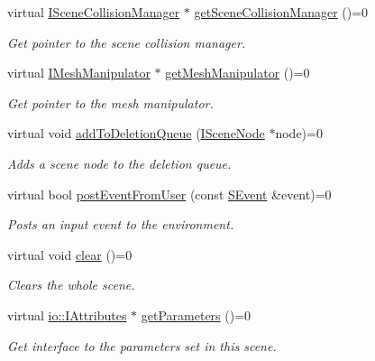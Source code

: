 \begin{DoxyCompactItemize}
virtual \hyperlink{classirr_1_1scene_1_1ISceneCollisionManager}{I\+Scene\+Collision\+Manager} $\ast$ \hyperlink{classirr_1_1scene_1_1ISceneManager_a433b65bfc974d069a1dc2fc296b23d9b}{get\+Scene\+Collision\+Manager} ()=0
\begin{DoxyCompactList}\small\item\em Get pointer to the scene collision manager. \end{DoxyCompactList}\item 
virtual \hyperlink{classirr_1_1scene_1_1IMeshManipulator}{I\+Mesh\+Manipulator} $\ast$ \hyperlink{classirr_1_1scene_1_1ISceneManager_a05138d6b5f99fced0061794fb5c42318}{get\+Mesh\+Manipulator} ()=0
\begin{DoxyCompactList}\small\item\em Get pointer to the mesh manipulator. \end{DoxyCompactList}\item 
virtual void \hyperlink{classirr_1_1scene_1_1ISceneManager_a11eac917a4c75c7a7730198d7bf31f5a}{add\+To\+Deletion\+Queue} (\hyperlink{classirr_1_1scene_1_1ISceneNode}{I\+Scene\+Node} $\ast$node)=0
\begin{DoxyCompactList}\small\item\em Adds a scene node to the deletion queue. \end{DoxyCompactList}\item 
virtual bool \hyperlink{classirr_1_1scene_1_1ISceneManager_ac68aa8d654884f19ad52fa28f11db424}{post\+Event\+From\+User} (const \hyperlink{structirr_1_1SEvent}{S\+Event} \&event)=0
\begin{DoxyCompactList}\small\item\em Posts an input event to the environment. \end{DoxyCompactList}\item 
virtual void \hyperlink{classirr_1_1scene_1_1ISceneManager_abaa3d11a833b89f7579848e234881988}{clear} ()=0
\begin{DoxyCompactList}\small\item\em Clears the whole scene. \end{DoxyCompactList}\item 
virtual \hyperlink{classirr_1_1io_1_1IAttributes}{io\+::\+I\+Attributes} $\ast$ \hyperlink{classirr_1_1scene_1_1ISceneManager_a4dba8ee7f48fdf6ede2c3f4b5fabcad3}{get\+Parameters} ()=0
\begin{DoxyCompactList}\small\item\em Get interface to the parameters set in this scene. \end{DoxyCompactList}\item 

\end{DoxyCompactItemize}
